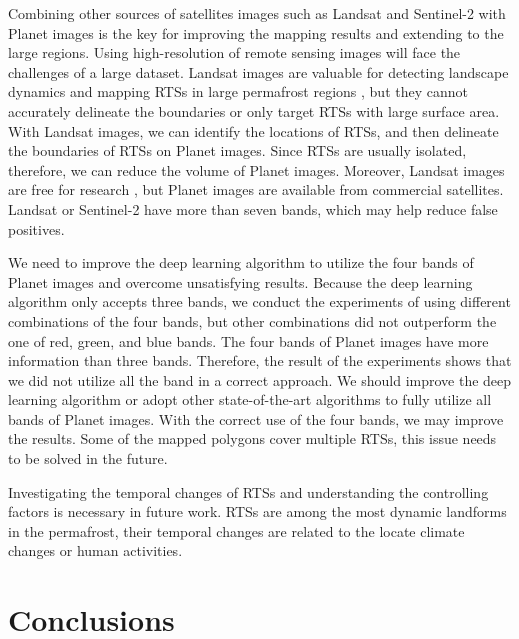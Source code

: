 \documentclass[preprint,12pt,authoryear]{elsarticle}
\begin{document}
Combining other sources of satellites images such as Landsat and Sentinel-2 with Planet images is the key for improving the mapping results and extending to the large regions. Using high-resolution of remote sensing images will face the challenges of a large dataset. Landsat images are valuable for detecting landscape dynamics and mapping RTSs in large permafrost regions \citep{nitze_detection_2016, nitze_landsat-based_2017, nitze2018remote}, but they cannot accurately delineate the boundaries or only target RTSs with large surface area. With Landsat images, we can identify the locations of RTSs, and then delineate the boundaries of RTSs on Planet images. Since RTSs are usually isolated, therefore, we can reduce the volume of Planet images. Moreover, Landsat images are free for research \citep{zhu2019benefits}, but Planet images are available from commercial satellites. Landsat or Sentinel-2 have more than seven bands, which may help reduce false positives. 

We need to improve the deep learning algorithm to utilize the four bands of Planet images and overcome unsatisfying results. Because the deep learning algorithm only accepts three bands, we conduct the experiments of using different combinations of the four bands, but other combinations did not outperform the one of red, green, and blue bands. The four bands of Planet images have more information than three bands. Therefore, the result of the experiments shows that we did not utilize all the band in a correct approach. We should improve the deep learning algorithm or adopt other state-of-the-art algorithms to fully utilize all bands of Planet images. With the correct use of the four bands, we may improve the results. Some of the mapped polygons cover multiple RTSs, this issue needs to be solved in the future. 

Investigating the temporal changes of RTSs and understanding the controlling factors is necessary in future work. RTSs are among the most dynamic landforms in the permafrost, their temporal changes are related to the locate climate changes or human activities. 

\section{Conclusions}
\label{sec_conclusion}
\end{document}
